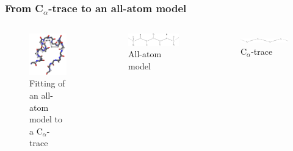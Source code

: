 \documentclass{beamer}
\begin{document}
\begin{frame}[t, fragile]
  \frametitle{From C$_\alpha$-trace to an all-atom model}
  \begin{columns}
    \column{5cm}
  \begin{figure}
    \centering
    \includegraphics[width=\textwidth]{../rapport/figures/forside.png}
    \caption{Fitting of an all-atom model to a C$_\alpha$-trace}
    \label{fig:front}
  \end{figure}

  \column{5cm}

  \begin{figure}
    \centering
    \includegraphics[width=\textwidth]{../rapport/figures/amino_connect.pdf}
    \caption{All-atom model}
    \label{fig:front}
  \end{figure}

  \begin{figure}
    \centering
    \includegraphics[width=\textwidth]{../rapport/figures/Calpha_backbone.pdf}
    \caption{C$_\alpha$-trace}
    \label{fig:front}
  \end{figure}
  \end{columns}
\end{frame}
\end{document}
